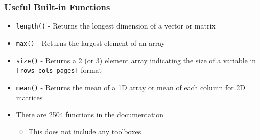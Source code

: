 \documentclass[14pt]{beamer}
\begin{document}
\begin{frame}
\frametitle{Useful Built-in Functions}
\begin{itemize}
\item \texttt{length()} - Returns the longest dimension of a vector or matrix
\item \texttt{max()} - Returns the largest element of an array
\item \texttt{size()} - Returns a 2 (or 3) element array indicating the size of a variable in \texttt{[rows cols pages]} format
\item \texttt{mean()} - Returns the mean of a 1D array or mean of each column for 2D matrices
\item There are 2504 functions in the documentation
	\begin{itemize}
		\item This does not include any toolboxes
	\end{itemize}
\end{itemize}
\end{frame}
\end{document}
